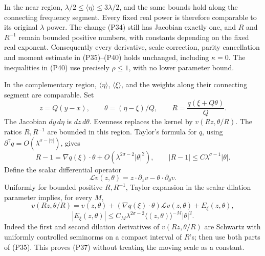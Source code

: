 \documentclass[
  11pt,
]{article}
\begin{document}
In the near region, \(\lambda/2\leq\langle\eta\rangle\leq3\lambda/2\),
and the same bounds hold along the connecting frequency segment. Every
fixed real power is therefore comparable to its original \(\lambda\)
power. The change (P34) still has Jacobian exactly one, and \(R\) and
\(R^{-1}\) remain bounded positive numbers, with constants depending on
the fixed real exponent. Consequently every derivative, scale
correction, parity cancellation and moment estimate in (P35)--(P40)
holds unchanged, including \(\kappa=0\). The inequalities in (P40) use
precisely \(\rho\leq1\), with no lower parameter bound.

In the complementary region, \(\langle\eta\rangle\),
\(\langle\xi\rangle\), and the weights along their connecting segment
are comparable. Set \[
 z=Q(y-x),\qquad \theta=(\eta-\xi)/Q,
 \qquad R=\frac{q(\xi+Q\theta)}{Q}.
\tag{P34}
\] The Jacobian \(dy\,d\eta\) is \(dz\,d\theta\). Evenness replaces the
kernel by \(v(Rz,\theta/R)\). The ratios \(R,R^{-1}\) are bounded in
this region. Taylor's formula for \(q\), using
\(\partial^\gamma q=O(\lambda^{\sigma-|\gamma|})\), gives \[
 R-1=\nabla q(\xi)\cdot\theta
       +O(\lambda^{2\sigma-2}|\theta|^2),
 \qquad |R-1|\leq C\lambda^{\sigma-1}|\theta|.
\tag{P35}
\] Define the scalar differential operator \[
 \mathcal L v(z,\theta)=z\cdot\partial_zv-\theta\cdot\partial_\theta v.
\tag{P36}
\] Uniformly for bounded positive \(R,R^{-1}\), Taylor expansion in the
scalar dilation parameter implies, for every \(M\), \[
 v(Rz,\theta/R)
 =v(z,\theta)+(\nabla q(\xi)\cdot\theta)\mathcal L v(z,\theta)
 +E_\xi(z,\theta),
\] \[
 |E_\xi(z,\theta)|
 \leq C_M\lambda^{2\sigma-2}
 \langle(z,\theta)\rangle^{-M}|\theta|^2.
\tag{P37}
\] Indeed the first and second dilation derivatives of
\(v(Rz,\theta/R)\) are Schwartz with uniformly controlled seminorms on a
compact interval of \(R\)'s; then use both parts of (P35). This proves
(P37) without treating the moving scale as a constant.
\end{document}
